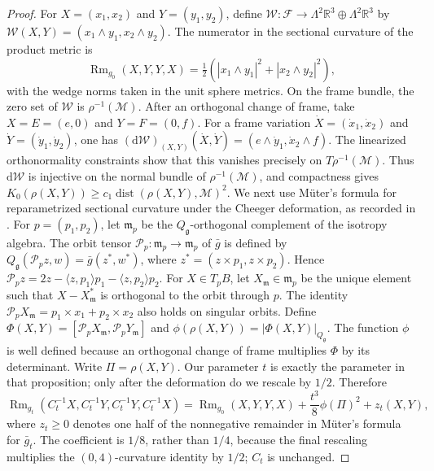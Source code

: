 \documentclass[11pt]{article}
\theoremstyle{definition}
\theoremstyle{remark}
\newcommand{\R}{\mathbb R}
\newcommand{\cM}{\mathcal M}
\newcommand{\Rm}{\operatorname{Rm}}
\newcommand{\dist}{\operatorname{dist}}
\newcommand{\dd}{\mathrm d}
\begin{document}
\begin{proof}
For $X=(x_1,x_2)$ and $Y=(y_1,y_2)$, define
$\mathcal W:\mathscr F\to
\Lambda^2\R^3\oplus\Lambda^2\R^3$ by
$\mathcal W(X,Y)=(x_1\wedge y_1,x_2\wedge y_2)$.  The numerator in the
sectional curvature of the product metric is
\[
\Rm_{g_0}(X,Y,Y,X)=\tfrac12(|x_1\wedge y_1|^2+|x_2\wedge y_2|^2),
\]
with the wedge norms taken in the unit sphere metrics.  On the frame bundle,
the zero set of $\mathcal W$ is $\rho^{-1}(\cM)$.  After an orthogonal change
of frame, take $X=E=(e,0)$ and $Y=F=(0,f)$.  For a frame variation
$\dot X=(\dot x_1,\dot x_2)$ and
$\dot Y=(\dot y_1,\dot y_2)$, one has
$(\dd\mathcal W)_{(X,Y)}(\dot X,\dot Y)
=(e\wedge\dot y_1,\dot x_2\wedge f)$.
The linearized orthonormality constraints show that this vanishes precisely
on $T\rho^{-1}(\cM)$.  Thus $\dd\mathcal W$ is injective on the normal bundle
of $\rho^{-1}(\cM)$, and compactness gives
$K_0(\rho(X,Y))\geq c_1\dist(\rho(X,Y),\cM)^2$.
We next use M\"uter's formula for reparametrized sectional curvature under the
Cheeger deformation, as recorded in
\cite[Proposition~1.3]{Ziller2009}.  For $p=(p_1,p_2)$, let
$\mathfrak m_p$ be the $Q_{\mathfrak g}$-orthogonal complement of the
isotropy algebra.  The orbit tensor
$\mathcal P_p:\mathfrak m_p\to\mathfrak m_p$ of $\bar g$ is defined by
$Q_{\mathfrak g}(\mathcal P_p z,w)=\bar g(z^*,w^*)$, where
$z^*=(z\times p_1,z\times p_2)$.  Hence
$\mathcal P_p z=2z-\langle z,p_1\rangle p_1-\langle z,p_2\rangle p_2$.
For $X\in T_pB$, let $X_{\mathfrak m}\in\mathfrak m_p$ be the unique element
such that $X-X_{\mathfrak m}^*$ is orthogonal to the orbit through $p$.  The
identity
$\mathcal P_p X_{\mathfrak m}=p_1\times x_1+p_2\times x_2$ also holds on
singular orbits.  Define
$\Phi(X,Y)=[\mathcal P_p X_{\mathfrak m},
\mathcal P_p Y_{\mathfrak m}]$ and
$\phi(\rho(X,Y))=|\Phi(X,Y)|_{Q_{\mathfrak g}}$.  The function
$\phi$ is well defined
because an orthogonal change of frame multiplies $\Phi$ by its
determinant.  Write $\Pi=\rho(X,Y)$.  Our parameter $t$ is
exactly the parameter in that proposition; only after the
deformation do we rescale by $1/2$.  Therefore
\begin{equation}                                                                    \label{eq:cheeger-formula}
 \Rm_{g_t}(C_t^{-1}X,C_t^{-1}Y,C_t^{-1}Y,C_t^{-1}X)=\Rm_{g_0}(X,Y,Y,X)+\frac{t^3}{8}\phi(\Pi)^2+z_t(X,Y),
\end{equation}
where $z_t\geq0$ denotes one half of the nonnegative remainder in M\"uter's
formula for $\bar g_t$.  The coefficient is $1/8$,
rather than $1/4$, because
the final rescaling multiplies the $(0,4)$-curvature identity by $1/2$;
$C_t$ is unchanged.


\end{proof}
\end{document}
